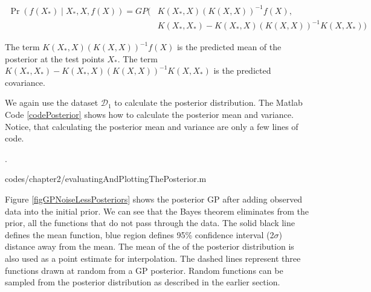  \begin{equation}\label{eqNoiseFreePosteriorGP}
  \begin{aligned}
  \Pr(f(X_{*}) \mid X_{*}, X, f(X)) = GP(  & K(X_{*}, X)( K(X, X) )^{-1}f(X),   \\ 
                                & K(X_{*}, X_{*}) - K(X_{*}, X)( K(X, X) )^{-1} K(X, X_{*}))
  \end{aligned}
  \end{equation}

The term $K(X_{*}, X)( K(X, X) )^{-1}f(X)$ is the predicted mean of the posterior at the test points $X_{*}$. The term $K(X_{*}, X_{*}) - K(X_{*}, X)( K(X, X) )^{-1} K(X, X_{*})$ is the predicted covariance. 

We again use the dataset $\mathcal{D}_{1}$ to calculate the posterior distribution. The Matlab Code \ref{codePosterior} shows how to calculate the posterior mean and variance. Notice, that calculating the posterior mean and variance are only a few lines of code. 

.%
\begin{mdframed}[hidealllines=true,backgroundcolor=lightgray!20]

                    {codes/chapter2/evaluatingAndPlottingThePosterior.m}
\end{mdframed}

Figure \ref{figGPNoiseLessPosteriors} shows the posterior GP after adding observed data into the initial prior. We can see that the Bayes theorem eliminates from the prior, all the functions that do not pass through the data. The solid black line defines the mean function, blue region defines 95\% confidence interval (2$\sigma$) distance away from the mean. The mean of the of the posterior distribution is also used as a point estimate for interpolation. The dashed lines represent three functions drawn at random from a GP posterior. Random functions can be sampled from the posterior distribution as described in the earlier section. 


